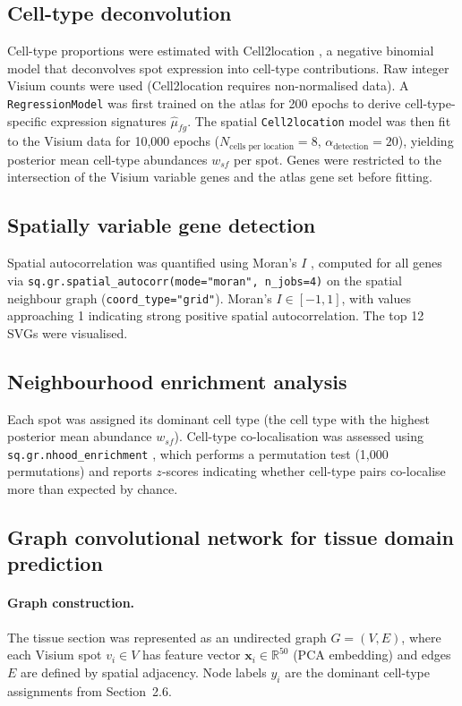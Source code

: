 \documentclass[12pt, a4paper]{article}
\begin{document}
\subsection{Cell-type deconvolution}

Cell-type proportions were estimated with Cell2location \citep{kleshchevnikov2022},
a negative binomial model that deconvolves spot expression into cell-type
contributions. Raw integer Visium counts were used (Cell2location requires
non-normalised data). A \texttt{RegressionModel} was first trained on the atlas
for 200 epochs to derive cell-type-specific expression signatures
$\hat{\mu}_{fg}$. The spatial \texttt{Cell2location} model was then fit to
the Visium data for 10,000 epochs ($N_{\text{cells per location}}=8$,
$\alpha_{\text{detection}}=20$), yielding posterior mean cell-type abundances
$w_{sf}$ per spot. Genes were restricted to the intersection of the Visium
variable genes and the atlas gene set before fitting.

\subsection{Spatially variable gene detection}

Spatial autocorrelation was quantified using Moran's $I$ \citep{moran1950},
computed for all genes via \texttt{sq.gr.spatial\_autocorr(mode="moran",
n\_jobs=4)} on the spatial neighbour graph (\texttt{coord\_type="grid"}).
Moran's $I \in [-1, 1]$, with values approaching 1 indicating strong
positive spatial autocorrelation. The top 12 SVGs were visualised.

\subsection{Neighbourhood enrichment analysis}

Each spot was assigned its dominant cell type (the cell type with the highest
posterior mean abundance $w_{sf}$). Cell-type co-localisation was assessed
using \texttt{sq.gr.nhood\_enrichment} \citep{palla2022}, which performs a
permutation test (1,000 permutations) and reports $z$-scores indicating
whether cell-type pairs co-localise more than expected by chance.

\subsection{Graph convolutional network for tissue domain prediction}

\paragraph{Graph construction.}
The tissue section was represented as an undirected graph $G=(V, E)$, where
each Visium spot $v_i \in V$ has feature vector $\mathbf{x}_i \in \mathbb{R}^{50}$
(PCA embedding) and edges $E$ are defined by spatial adjacency. Node labels
$y_i$ are the dominant cell-type assignments from Section~2.6.
\end{document}
